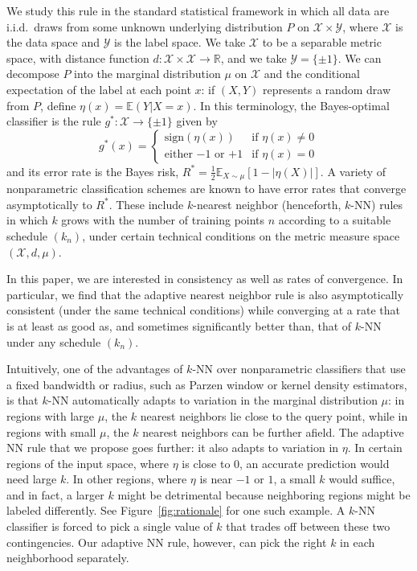 \documentclass{article}
\def\R{{\mathbb{R}}}
\def\E{{\mathbb E}}
\def\X{{\mathcal X}}
\def\Y{{\mathcal Y}}
\newcommand{\sign}{\mbox{sign}}
\begin{document}
We study this rule in the standard statistical framework in which all data are
i.i.d.\ draws from some unknown underlying distribution $P$ on $\X
\times \Y$, where $\X$ is the data space and $\Y$ is the label
space. We take $\X$ to be a separable metric space, with distance
function $d: \X \times \X \rightarrow \R$, and we take $\Y =
\{\pm 1\}$. We can decompose $P$ into the
marginal distribution $\mu$ on $\X$ and the conditional expectation of
the label at each point $x$: if $(X,Y)$ represents a random draw from
$P$, define $\eta(x) = \E(Y| X = x)$. In this terminology, the
Bayes-optimal classifier is the rule $g^*: \X \rightarrow \{\pm 1\}$
given by
\begin{equation}
g^*(x) = 
\left\{
\begin{array}{ll}
\sign(\eta(x)) & \mbox{if $\eta(x) \neq 0$} \\
\mbox{either $-1$ or $+1$} & \mbox{if $\eta(x) = 0$}
\end{array}
\right.
\label{eq:bayes-opt}
\end{equation}
and its error rate is the Bayes risk, $R^* = \frac{1}{2}\E_{X \sim \mu} \left[1-|\eta(X)| \right]$. A variety of nonparametric classification schemes are known to have error rates that converge asymptotically to $R^*$. These include $k$-nearest neighbor (henceforth, $k$-NN) rules~\cite{FH51} in which $k$ grows with the number of training points $n$ according to a suitable schedule $(k_n)$, under certain technical conditions on the metric measure space $(\X, d, \mu)$.

In this paper, we are interested in consistency as well as rates of
convergence. In particular, we find that the adaptive nearest neighbor
rule is also asymptotically consistent (under the same technical
conditions) while converging at a rate that is at least as good as,
and sometimes significantly better than, that of $k$-NN
under any schedule $(k_n)$.

Intuitively, one of the advantages of $k$-NN over nonparametric
classifiers that use a fixed bandwidth or radius, such as Parzen
window or kernel density estimators, is that $k$-NN automatically
adapts to variation in the marginal distribution $\mu$: in regions
with large $\mu$, the $k$ nearest neighbors lie close to the query
point, while in regions with small $\mu$, the $k$ nearest neighbors
can be further afield. The adaptive NN rule that we propose goes
further: it also adapts to variation in $\eta$. In certain regions of
the input space, where $\eta$ is close to $0$, an accurate
prediction would need large $k$. In other regions, where $\eta$ is
near $-1$ or $1$, a small $k$ would suffice, and in fact, a larger $k$
might be detrimental because neighboring regions might be labeled
differently. See Figure~\ref{fig:rationale} for one such example. A
$k$-NN classifier is forced to pick a single value of $k$ that trades
off between these two contingencies. Our adaptive NN rule, however,
can pick the right $k$ in each neighborhood separately.
\end{document}
